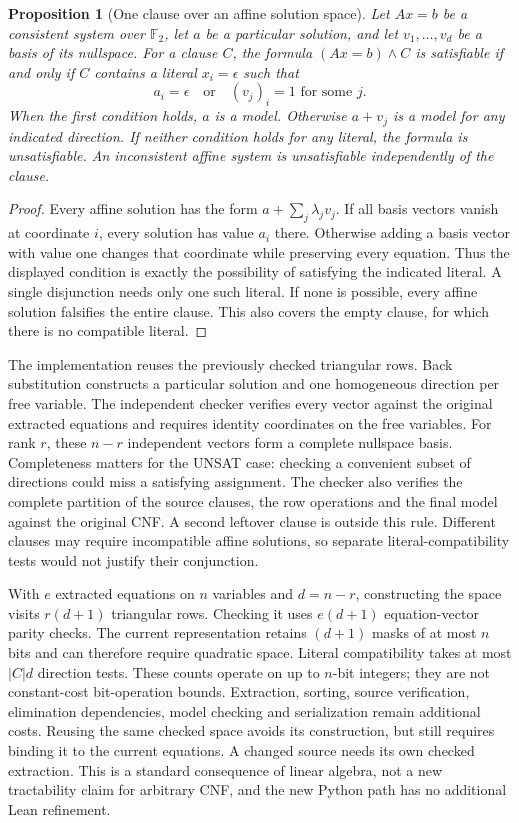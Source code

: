 \documentclass[11pt,a4paper]{article}
\numberwithin{equation}{section}
\theoremstyle{plain}
\newtheorem{proposition}[lemma]{Proposition}
\theoremstyle{definition}
\theoremstyle{remark}
\begin{document}
\begin{proposition}[One clause over an affine solution space]
\label{prop:affine-one-clause}
Let $A x=b$ be a consistent system over $\mathbb F_2$, let $a$ be a particular solution, and let $v_1,\ldots,v_d$ be a basis of its nullspace. For a clause $C$, the formula $(Ax=b)\land C$ is satisfiable if and only if $C$ contains a literal $x_i=\epsilon$ such that
\[
 a_i=\epsilon \quad\text{or}\quad (v_j)_i=1\text{ for some }j.
\]
When the first condition holds, $a$ is a model. Otherwise $a+v_j$ is a model for any indicated direction. If neither condition holds for any literal, the formula is unsatisfiable. An inconsistent affine system is unsatisfiable independently of the clause.
\end{proposition}
\begin{proof}
Every affine solution has the form $a+\sum_j\lambda_jv_j$. If all basis vectors vanish at coordinate $i$, every solution has value $a_i$ there. Otherwise adding a basis vector with value one changes that coordinate while preserving every equation. Thus the displayed condition is exactly the possibility of satisfying the indicated literal. A single disjunction needs only one such literal. If none is possible, every affine solution falsifies the entire clause. This also covers the empty clause, for which there is no compatible literal.
\end{proof}

The implementation reuses the previously checked triangular rows. Back substitution constructs a particular solution and one homogeneous direction per free variable. The independent checker verifies every vector against the original extracted equations and requires identity coordinates on the free variables. For rank $r$, these $n-r$ independent vectors form a complete nullspace basis. Completeness matters for the UNSAT case: checking a convenient subset of directions could miss a satisfying assignment. The checker also verifies the complete partition of the source clauses, the row operations and the final model against the original CNF. A second leftover clause is outside this rule. Different clauses may require incompatible affine solutions, so separate literal-compatibility tests would not justify their conjunction.

With $e$ extracted equations on $n$ variables and $d=n-r$, constructing the space visits $r(d+1)$ triangular rows. Checking it uses $e(d+1)$ equation-vector parity checks. The current representation retains $(d+1)$ masks of at most $n$ bits and can therefore require quadratic space. Literal compatibility takes at most $|C|d$ direction tests. These counts operate on up to $n$-bit integers; they are not constant-cost bit-operation bounds. Extraction, sorting, source verification, elimination dependencies, model checking and serialization remain additional costs. Reusing the same checked space avoids its construction, but still requires binding it to the current equations. A changed source needs its own checked extraction. This is a standard consequence of linear algebra, not a new tractability claim for arbitrary CNF, and the new Python path has no additional Lean refinement.
\end{document}
